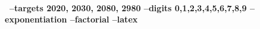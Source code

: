 \documentclass{article}
\theoremstyle{nonumberplain}
\begin{document}
\paragraph*{~--targets 2020, 2030, 2080, 2980 --digits 0,1,2,3,4,5,6,7,8,9 --exponentiation --factorial --latex~}
\end{document}
